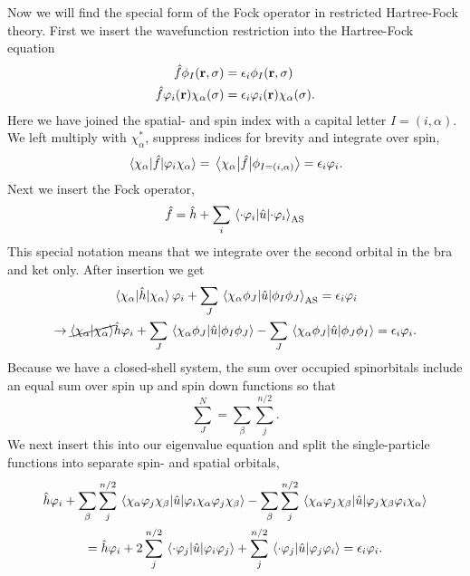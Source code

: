 Now we will find the special form of the Fock operator in restricted 
Hartree-Fock theory. First we insert the wavefunction restriction into 
the Hartree-Fock equation
\begin{equation}
    \begin{aligned}
        \hat{f}\phi_I(\vb{r}, \sigma) &= \epsilon_i \phi_I(\vb{r}, \sigma) \\
        \hat{f}\varphi_i(\vb{r}) \chi_\alpha(\sigma)
        &= \epsilon_i \varphi_i(\vb{r})\chi_\alpha(\sigma).
    \end{aligned}
\end{equation}
Here we have joined the spatial- and spin index with a capital letter $I = (i, \alpha)$.
We left multiply with $\chi_\alpha^*$, suppress indices for brevity and integrate over spin,
\begin{equation}
    \mel{\chi_\alpha}{\hat{f}}{\varphi_i\chi_\alpha}
    = \mel{\chi_\alpha}{\hat{f}}{\phi_{I = (i,\alpha)}}
    = \epsilon_i\varphi_i.
\end{equation}
Next we insert the Fock operator,
\begin{equation*}
    \hat{f} = \hat{h} + \sum_i\mel{\cdot\varphi_i}{\hat{u}}{\cdot\varphi_i}_\text{AS}
\end{equation*} 
This special notation means that we integrate over the second orbital in 
the bra and ket only. After insertion we get
\begin{equation}
   \begin{gathered}
        \mel{\chi_\alpha}{\hat{h}}{\chi_\alpha}\varphi_i
        + \sum_J \mel{\chi_\alpha\phi_J}{\hat{u}}{\phi_I\phi_J}_\text{AS}
        = \epsilon_i\varphi_i \\
        \to\cancel{\braket{\chi_\alpha}}\hat{h}\varphi_i 
        + \sum_J \mel{\chi_\alpha\phi_J}{\hat{u}}{\phi_I\phi_J}
        - \sum_J \mel{\chi_\alpha\phi_J}{\hat{u}}{\phi_J\phi_I}
        = \epsilon_i\varphi_i.
   \end{gathered} 
\end{equation}
Because we have a closed-shell system, the sum over occupied spinorbitals include an 
equal sum over spin up and spin down functions so that
\begin{equation*}
    \sum_J^N = \sum_\beta\sum_j^{n/2}.
\end{equation*} 
We next insert this into our eigenvalue equation and split the single-particle functions 
into separate spin- and spatial orbitals,
\begin{equation}
    \begin{gathered}
        \hat{h}\varphi_i 
        + \sum_\beta\sum_j^{n/2}
            \mel{\chi_\alpha\varphi_j\chi_\beta}{\hat{u}}{\varphi_i\chi_\alpha\varphi_j\chi_\beta} 
        - \sum_\beta\sum_j^{n/2}
            \mel{\chi_\alpha\varphi_j\chi_\beta}{\hat{u}}{\varphi_j\chi_\beta\varphi_i\chi_\alpha} \\
        = \hat{h}\varphi_i 
        + 2\sum_j^{n/2} \mel{\cdot \varphi_j}{\hat{u}}{\varphi_i\varphi_j}
        +  \sum_j^{n/2} \mel{\cdot \varphi_j}{\hat{u}}{\varphi_j\varphi_i}
        = \epsilon_i\varphi_i.
    \end{gathered}
\end{equation}
